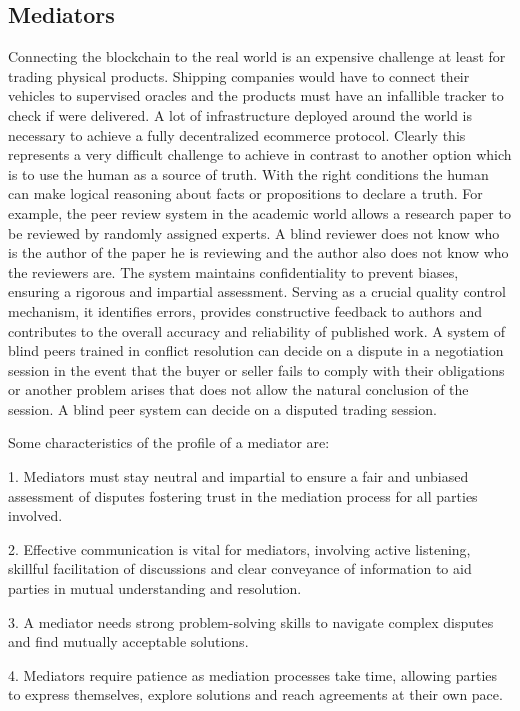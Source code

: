 \documentclass[12pt]{article}
\begin{document}
\subsection { Mediators }  

Connecting the blockchain to the real world is an expensive challenge at least for trading physical products.
Shipping companies would have to connect their vehicles to supervised oracles and the products must have an infallible tracker to check if were delivered.
A lot of infrastructure deployed around the world is necessary to achieve a fully decentralized ecommerce protocol.
Clearly this represents a very difficult challenge to achieve in contrast to another option which is to use the human as a source of truth.
With the right conditions the human can make logical reasoning about facts or propositions to declare a truth.
For example, the peer review system in the academic world allows a research paper to be reviewed by randomly assigned experts.
A blind reviewer does not know who is the author of the paper he is reviewing and the author also does not know who the reviewers are.
The system maintains confidentiality to prevent biases, ensuring a rigorous and impartial assessment. Serving as a crucial quality control mechanism, it identifies errors, provides constructive feedback to authors and contributes to the overall accuracy and reliability of published work. 
A system of blind peers trained in conflict resolution can decide on a dispute in a negotiation session in the event that the buyer or seller fails to comply with their obligations or another problem arises that does not allow the natural conclusion of the session.
A blind peer system can decide on a disputed trading session.

Some characteristics of the profile of a mediator are:

1. Mediators must stay neutral and impartial to ensure a fair and unbiased assessment of disputes fostering trust in the mediation process for all parties involved.

2. Effective communication is vital for mediators, involving active listening, skillful facilitation of discussions and clear conveyance of information to aid parties in mutual understanding and resolution.

3. A mediator needs strong problem-solving skills to navigate complex disputes and find mutually acceptable solutions. 

4. Mediators require patience as mediation processes take time, allowing parties to express themselves, explore solutions and reach agreements at their own pace.
\end{document}
